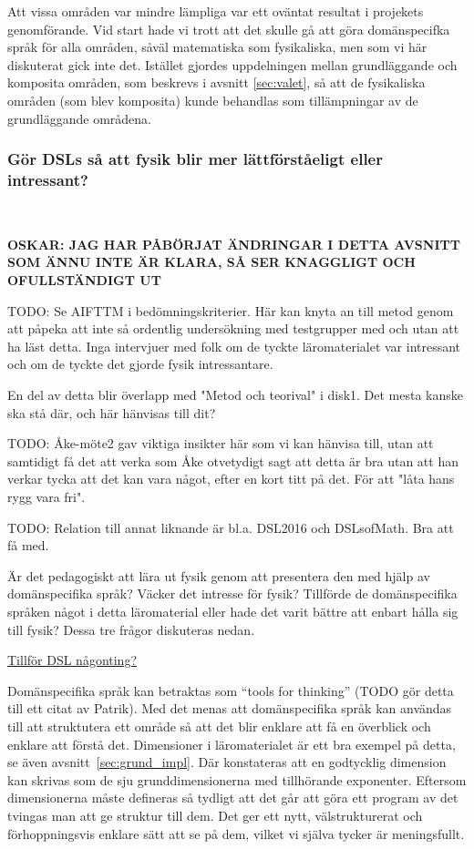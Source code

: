 \begin{draft}
Att vissa områden var mindre lämpliga var ett oväntat resultat i projekets genomförande. Vid start hade vi trott att det skulle gå att göra domänspecifka språk för alla områden, såväl matematiska som fysikaliska, men som vi här diskuterat gick inte det. Istället gjordes uppdelningen mellan grundläggande och komposita områden, som beskrevs i avsnitt \ref{sec:valet}, så att de fysikaliska områden (som blev komposita) kunde behandlas som tillämpningar av de grundläggande områdena.

\subsubsection{Gör DSLs så att fysik blir mer lättförståeligt eller
intressant?}~\label{sec:bara_fysik}

\textbf{OSKAR: JAG HAR PÅBÖRJAT ÄNDRINGAR I DETTA AVSNITT SOM ÄNNU INTE ÄR KLARA, SÅ SER KNAGGLIGT OCH OFULLSTÄNDIGT UT}

TODO: Se AIFTTM i bedömningskriterier. Här kan knyta an till metod genom att
påpeka att inte så ordentlig undersökning med testgrupper med och utan att ha
läst detta. Inga intervjuer med folk om de tyckte läromaterialet var intressant
och om de tyckte det gjorde fysik intressantare.

En del av detta blir överlapp med "Metod och teorival" i disk1. Det mesta kanske
ska stå där, och här hänvisas till dit?

TODO: Åke-möte2 gav viktiga insikter här som vi kan hänvisa till, utan att
samtidigt få det att verka som Åke otvetydigt sagt att detta är bra utan att han
verkar tycka att det kan vara något, efter en kort titt på det. För att "låta
hans rygg vara fri".

TODO: Relation till annat liknande är bl.a. DSL2016 och DSLsofMath. Bra att få
med.

Är det pedagogiskt att lära ut fysik genom att presentera den med hjälp av
domänspecifika språk? Väcker det intresse för fysik? Tillförde de domänspecifika
språken något i detta läromaterial eller hade det varit bättre att enbart hålla
sig till fysik? Dessa tre frågor diskuteras nedan.

{\Large \underline{Tillför DSL någonting?}}

Domänspecifika språk kan betraktas som ``tools for thinking'' (TODO gör detta
till ett citat av Patrik). Med det menas att domänspecifika språk kan användas
till att struktutera ett område så att det blir enklare att få en överblick och
enklare att förstå det. Dimensioner i läromaterialet är ett bra exempel på
detta, se även avsnitt~\ref{sec:grund_impl}. Där konstateras att en godtycklig
dimension kan skrivas som de sju grunddimensionerna med tillhörande exponenter.
Eftersom dimensionerna måste defineras så tydligt att det går att göra ett
program av det tvingas man att ge struktur till dem. Det ger ett nytt,
välstrukturerat och förhoppningsvis enklare sätt att se på dem, vilket vi själva
tycker är meningsfullt.


\end{draft}
